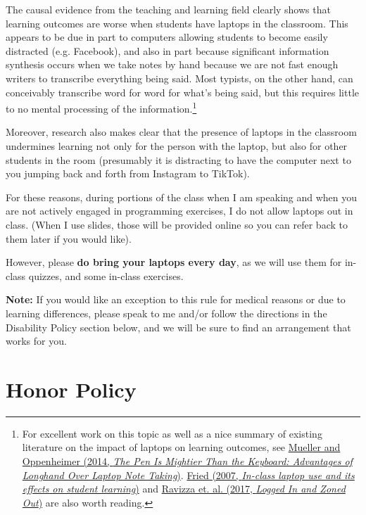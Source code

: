 \documentclass[12pt]{article}
\begin{document}
The causal evidence from the teaching and learning field clearly shows that learning outcomes are worse when students have laptops in the classroom. This appears to be due in part to computers allowing students to become easily distracted (e.g. Facebook), and also in part because significant information synthesis occurs when we take notes by hand because we are not fast enough writers to transcribe everything being said.  Most typists, on the other hand, can conceivably transcribe word for word for what's being said, but this requires little to no mental processing of the information.\footnote{For excellent work on this topic as well as a nice summary of existing literature on the impact of laptops on learning outcomes, see \href{https://cpb-us-w2.wpmucdn.com/sites.udel.edu/dist/6/132/files/2010/11/Psychological-Science-2014-Mueller-0956797614524581-1u0h0yu.pdf}{Mueller and Oppenheimer (2014, \emph{The Pen Is Mightier Than the Keyboard: Advantages of Longhand Over Laptop  Note Taking})}. \href{https://www.winona.edu/psychology/media/friedlaptopfinal.pdf}{Fried (2007, \emph{In-class laptop use and its effects on student learning})} and  \href{https://www.ncbi.nlm.nih.gov/pubmed/28182528}{Ravizza et. al. (2017, \emph{Logged In and Zoned Out})} are also worth reading.}

Moreover, research also makes clear that the presence of laptops in the classroom undermines learning not only for the person with the laptop, but also for other students in the room (presumably it is distracting to have the computer next to you jumping back and forth from Instagram to TikTok).

For these reasons, during portions of the class when I am speaking and when you are not actively engaged in programming exercises, I do not allow laptops out in class. (When I use slides, those will be provided online so you can refer back to them later if you would like).

However, please \textbf{do bring your laptops every day}, as we will use them for in-class quizzes, and some in-class exercises.

\textbf{Note:} If you would like an exception to this rule for medical reasons or due to learning differences, please speak to me and/or follow the directions in the Disability Policy section below, and we will be sure to find an arrangement that works for you.

\section{Honor Policy}
\end{document}
